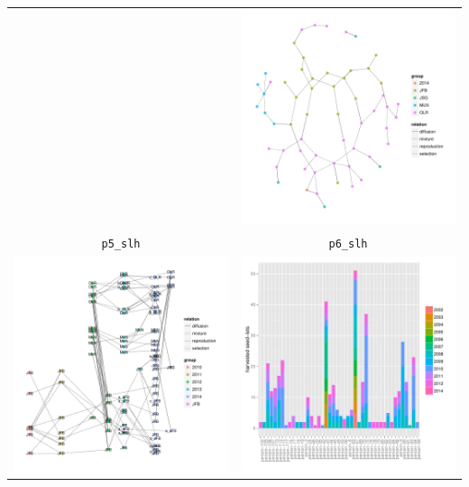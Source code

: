\documentclass{article}\usepackage[]{graphicx}\usepackage[]{color}
\newenvironment{knitrout}{}{} %
\begin{document}
\begin{itemize}
\begin{center}
\begin{tabular}{cc}
\begin{knitrout}
{}



\end{knitrout}
&
\begin{knitrout}
\definecolor{shadecolor}{rgb}{0.969, 0.969, 0.969}\color{fgcolor}

{\centering \includegraphics[width=.4\textwidth]{figures/shinemas2R_unnamed-chunk-29-1} 

}



\end{knitrout}
\\
\texttt{p5\_slh} & \texttt{p6\_slh} \\
\begin{knitrout}
\definecolor{shadecolor}{rgb}{0.969, 0.969, 0.969}\color{fgcolor}

{\centering \includegraphics[width=.4\textwidth]{figures/shinemas2R_unnamed-chunk-30-1} 

}



\end{knitrout}
&
\begin{knitrout}
\definecolor{shadecolor}{rgb}{0.969, 0.969, 0.969}\color{fgcolor}

{\centering \includegraphics[width=.4\textwidth]{figures/shinemas2R_unnamed-chunk-31-1} 

}
\end{knitrout}
\end{tabular}
\end{center}
\end{itemize}
\end{document}

